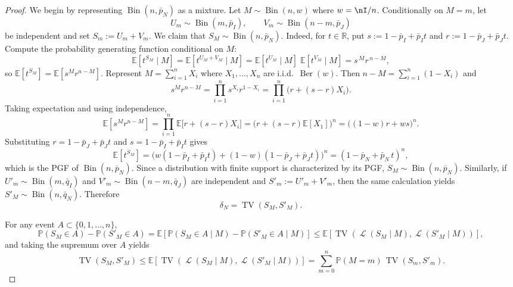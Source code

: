 \documentclass[11pt]{amsart}
\theoremstyle{plain}
\theoremstyle{definition}
\DeclareMathOperator{\TV}{TV}
\DeclareMathOperator{\Bin}{Bin}
\DeclareMathOperator{\Ber}{Ber}
\DeclareMathOperator{\Law}{\mathcal{L} }
\newcommand{\R}{\mathbb{R}}
\newcommand{\E}{\mathbb{E}}
\renewcommand{\P}{\mathbb{P}}
\newcommand{\mybin}[2]{\Bin(#1,#2)}
\begin{document}
\begin{proof}
We begin by representing $\mybin{n}{\bar p_N}$ as a mixture.
Let $M\sim\mybin{n}{w}$ where $w = \nI/n$. Conditionally on $M=m$, let
\[
U_m\sim\mybin{m}{\bar p_I},\qquad V_m\sim\mybin{n-m}{\bar p_J}
\]
be independent and set $S_m:=U_m+V_m$.
We claim that $S_M\sim\mybin{n}{\bar p_N}$.
Indeed, for $t\in\R$, put $s:=1-\bar p_I+\bar p_I t$ and $r:=1-\bar p_J+\bar p_J t$.
Compute the probability generating function conditional on $M$:
\[
\E[t^{S_M}\mid M]
=\E[t^{U_M+V_M}\mid M]
=\E[t^{U_M}\mid M]\;\E[t^{V_M}\mid M]
=s^{\,M}r^{\,n-M},
\]
so $\E[t^{S_M}]=\E[s^M r^{n-M}]$.
Represent $M=\sum_{i=1}^n X_i$ where
$X_1,\dots,X_n$ are i.i.d.\ $\Ber(w)$. Then $n-M=\sum_{i=1}^n(1-X_i)$ and
\[
s^M r^{n-M}
=\prod_{i=1}^n s^{X_i}r^{1-X_i}
=\prod_{i=1}^n\bigl(r+(s-r)X_i\bigr).
\]
Taking expectation and using independence,
\[
\E[s^M r^{n-M}]
=\prod_{i=1}^n \E\bigl[r+(s-r)X_i\bigr]
=\bigl(r+(s-r)\E[X_1]\bigr)^n
=\bigl((1-w)r+ws\bigr)^n.
\]
Substituting $r=1-\bar p_J+\bar p_J t$ and $s=1-\bar p_I+\bar p_I t$ gives
\[
\E[t^{S_M}]
=\bigl(w(1-\bar p_I+\bar p_I t)+(1-w)(1-\bar p_J+\bar p_J t)\bigr)^n
=(1-\bar p_N+\bar p_N\,t)^n,
\]
which is the PGF of $\mybin{n}{\bar p_N}$.
Since a distribution with finite support is characterized by its PGF,
$S_M\sim\mybin{n}{\bar p_N}$.
Similarly, if $U'_m\sim\mybin{m}{\bar q_I}$ and $V'_m\sim\mybin{n-m}{\bar q_J}$ are independent and
$S'_m:=U'_m+V'_m$, then the same calculation yields $S'_M\sim\mybin{n}{\bar q_N}$.
Therefore
\[
\delta_{N}=\TV(S_M,S'_M).
\]

For any event $A\subset\{0,1,\dots,n\}$,
\[
\P(S_M\in A)-\P(S'_M\in A)
=\E\!\left[\P(S_M\in A\mid M)-\P(S'_M\in A\mid M)\right]
\le \E\!\left[\TV(\Law(S_M\mid M),\Law(S'_M\mid M))\right],
\]
and taking the supremum over $A$ yields
\[
\TV(S_M,S'_M)\le \E\!\left[\TV(\Law(S_M\mid M),\Law(S'_M\mid M))\right]
=\sum_{m=0}^n \P(M=m)\,\TV(S_m,S'_m).
\]


\end{proof}
\end{document}
